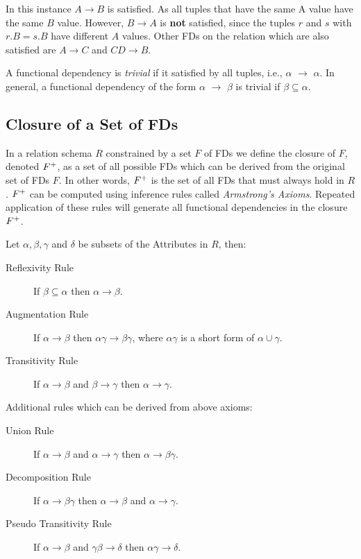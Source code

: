 In this instance $A \rightarrow B$  is satisfied.
As all tuples that have the same A value have the same $B$ value. However,
$B \rightarrow A$ is \textbf{not} satisfied, since the tuples $r$ and $s$ with $r.B = s.B$ have
different $A$ values. Other FDs on the relation which are also satisfied are
$A \rightarrow C$ and $CD \rightarrow B$.

A functional dependency is \textit{trivial} if it satisfied by all tuples, i.e., $\alpha$ $\rightarrow$ $\alpha$.
In general, a functional dependency of the form $\alpha$ $\rightarrow$ $\beta$ is trivial if 
$\beta \subseteq \alpha$.

\subsection{Closure of a Set of FDs}
\label{sec:closureF}
In a relation schema $R$ constrained by a set $F$ of FDs we define the closure of $F$, denoted $F\sp{+}$,
as a set of all possible FDs which can be derived from the original set of FDs $F$. In 
other words, $F\sp{+}$ is the set of all FDs that must always hold in $R$. $F\sp{+}$ can be
computed using inference rules called \textit{Armstrong's Axioms}. 
Repeated application of these rules will generate all functional dependencies in the closure $F\sp{+}$.

Let $\alpha, \beta, \gamma$ and $\delta$ be subsets of the Attributes in $R$, then:

\begin{description}
  \item[Reflexivity Rule] If $\beta \subseteq \alpha$ then $\alpha \rightarrow \beta$.
  \item[Augmentation Rule] If $\alpha \rightarrow \beta$ then $\alpha\gamma \rightarrow \beta\gamma$, where $\alpha\gamma$ is a short form of $\alpha \cup \gamma$.
  \item[Transitivity Rule] If $\alpha \rightarrow \beta$ and $\beta \rightarrow \gamma$ then $\alpha \rightarrow \gamma$.
\end{description}

\noindent Additional rules which can be derived from above axioms:

\begin{description}
  \item[Union Rule] If $\alpha \rightarrow \beta$ and $\alpha \rightarrow \gamma$ then $\alpha \rightarrow \beta\gamma$.
  \item[Decomposition Rule] If $\alpha \rightarrow \beta\gamma$ then $\alpha \rightarrow \beta$ and $\alpha \rightarrow \gamma$.
  \item[Pseudo Transitivity Rule] If $\alpha \rightarrow \beta$ and $\gamma\beta \rightarrow \delta$ then $\alpha\gamma \rightarrow \delta$.
\end{description}

